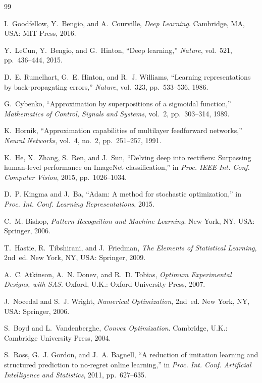 \begin{thebibliography}{99}

I.~Goodfellow, Y.~Bengio, and A.~Courville,
\emph{Deep Learning}.
Cambridge, MA, USA: MIT Press, 2016.

Y.~LeCun, Y.~Bengio, and G.~Hinton,
``Deep learning,''
\emph{Nature}, vol.~521, pp.~436--444, 2015.

D.~E. Rumelhart, G.~E. Hinton, and R.~J. Williams,
``Learning representations by back-propagating errors,''
\emph{Nature}, vol.~323, pp.~533--536, 1986.

G.~Cybenko,
``Approximation by superpositions of a sigmoidal function,''
\emph{Mathematics of Control, Signals and Systems}, vol.~2, pp.~303--314, 1989.

K.~Hornik,
``Approximation capabilities of multilayer feedforward networks,''
\emph{Neural Networks}, vol.~4, no.~2, pp.~251--257, 1991.

K.~He, X.~Zhang, S.~Ren, and J.~Sun,
``Delving deep into rectifiers: Surpassing human-level performance on ImageNet classification,''
in \emph{Proc. IEEE Int. Conf. Computer Vision}, 2015, pp.~1026--1034.

D.~P. Kingma and J.~Ba,
``Adam: A method for stochastic optimization,''
in \emph{Proc. Int. Conf. Learning Representations}, 2015.

C.~M. Bishop,
\emph{Pattern Recognition and Machine Learning}.
New York, NY, USA: Springer, 2006.

T.~Hastie, R.~Tibshirani, and J.~Friedman,
\emph{The Elements of Statistical Learning}, 2nd~ed.
New York, NY, USA: Springer, 2009.

A.~C. Atkinson, A.~N. Donev, and R.~D. Tobias,
\emph{Optimum Experimental Designs, with SAS}.
Oxford, U.K.: Oxford University Press, 2007.

J.~Nocedal and S.~J. Wright,
\emph{Numerical Optimization}, 2nd~ed.
New York, NY, USA: Springer, 2006.

S.~Boyd and L.~Vandenberghe,
\emph{Convex Optimization}.
Cambridge, U.K.: Cambridge University Press, 2004.

S.~Ross, G.~J. Gordon, and J.~A. Bagnell,
``A reduction of imitation learning and structured prediction to no-regret online learning,''
in \emph{Proc. Int. Conf. Artificial Intelligence and Statistics}, 2011, pp.~627--635.


\end{thebibliography}
